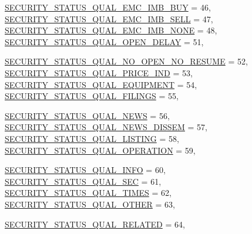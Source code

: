 \begin{CompactItemize}
\hyperlink{namespaceWombat_2de6f22c731ba94169dc24b8054862b84f33b9b3679b42fef1af477b3409d1e9}{SECURITY\_\-STATUS\_\-QUAL\_\-EMC\_\-IMB\_\-BUY} =  46, 
\hyperlink{namespaceWombat_2de6f22c731ba94169dc24b8054862b8141278ffa3ef7c9f0fbb9ec6ad490ee4}{SECURITY\_\-STATUS\_\-QUAL\_\-EMC\_\-IMB\_\-SELL} =  47, 
\hyperlink{namespaceWombat_2de6f22c731ba94169dc24b8054862b8c8f9fc1651c3292b70c3ff3699b7d68a}{SECURITY\_\-STATUS\_\-QUAL\_\-EMC\_\-IMB\_\-NONE} =  48, 
\hyperlink{namespaceWombat_2de6f22c731ba94169dc24b8054862b8493f8a15af84b4485b5102cd797efdb1}{SECURITY\_\-STATUS\_\-QUAL\_\-OPEN\_\-DELAY} =  51, 
\par
\hyperlink{namespaceWombat_2de6f22c731ba94169dc24b8054862b871071b7d82d258d10b20cad685e0b333}{SECURITY\_\-STATUS\_\-QUAL\_\-NO\_\-OPEN\_\-NO\_\-RESUME} =  52, 
\hyperlink{namespaceWombat_2de6f22c731ba94169dc24b8054862b841afa77ecf01f0e323aa7ed22ae49a9b}{SECURITY\_\-STATUS\_\-QUAL\_\-PRICE\_\-IND} =  53, 
\hyperlink{namespaceWombat_2de6f22c731ba94169dc24b8054862b8ada27f5698f2987df28d5f98be9ae94b}{SECURITY\_\-STATUS\_\-QUAL\_\-EQUIPMENT} =  54, 
\hyperlink{namespaceWombat_2de6f22c731ba94169dc24b8054862b8d8c563139eeb1d9559423ec9fe552685}{SECURITY\_\-STATUS\_\-QUAL\_\-FILINGS} =  55, 
\par
\hyperlink{namespaceWombat_2de6f22c731ba94169dc24b8054862b876a6d93ebd4b3c232d5f96a304374d6a}{SECURITY\_\-STATUS\_\-QUAL\_\-NEWS} =  56, 
\hyperlink{namespaceWombat_2de6f22c731ba94169dc24b8054862b82d67cd8c01e19284bfecf52f44ca93cf}{SECURITY\_\-STATUS\_\-QUAL\_\-NEWS\_\-DISSEM} =  57, 
\hyperlink{namespaceWombat_2de6f22c731ba94169dc24b8054862b817ca896aa26dcb27d6020cf46a802d67}{SECURITY\_\-STATUS\_\-QUAL\_\-LISTING} =  58, 
\hyperlink{namespaceWombat_2de6f22c731ba94169dc24b8054862b859f1979c835f5f6d3d140113d4c0499f}{SECURITY\_\-STATUS\_\-QUAL\_\-OPERATION} =  59, 
\par
\hyperlink{namespaceWombat_2de6f22c731ba94169dc24b8054862b8e8bc387bc5d1d2856a6088f63e1af3ca}{SECURITY\_\-STATUS\_\-QUAL\_\-INFO} =  60, 
\hyperlink{namespaceWombat_2de6f22c731ba94169dc24b8054862b83f07f7ee4c4aca1c7fd6b99b8ad6e361}{SECURITY\_\-STATUS\_\-QUAL\_\-SEC} =  61, 
\hyperlink{namespaceWombat_2de6f22c731ba94169dc24b8054862b81c2597d13f3cb117993bbca6f32e0425}{SECURITY\_\-STATUS\_\-QUAL\_\-TIMES} =  62, 
\hyperlink{namespaceWombat_2de6f22c731ba94169dc24b8054862b8d0ab334d790fc2f6d6274004c9ea4c94}{SECURITY\_\-STATUS\_\-QUAL\_\-OTHER} =  63, 
\par
\hyperlink{namespaceWombat_2de6f22c731ba94169dc24b8054862b803d5b0d7effc9655374b120d2feb7aff}{SECURITY\_\-STATUS\_\-QUAL\_\-RELATED} =  64, 

\end{CompactItemize}
